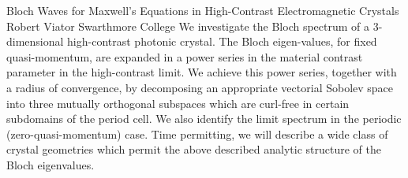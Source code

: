 \begin{addmargin}[2em]{0em}
\vspace{1.5ex}
\abs
{Bloch Waves for Maxwell's Equations in High-Contrast Electromagnetic Crystals}
{Robert Viator}
{Swarthmore College}
{We investigate the Bloch spectrum of a 3-dimensional high-contrast photonic crystal. The Bloch eigen-values, for fixed quasi-momentum, are expanded in a power series in the material contrast parameter in the high-contrast limit. We achieve this power series, together with a radius of convergence, by decomposing an appropriate vectorial Sobolev space into three mutually orthogonal subspaces which are curl-free in certain subdomains of the period cell. We also identify the limit spectrum in the periodic (zero-quasi-momentum) case. Time permitting, we will describe a wide class of crystal geometries which permit the above described analytic structure of the Bloch eigenvalues.}
\end{addmargin}



